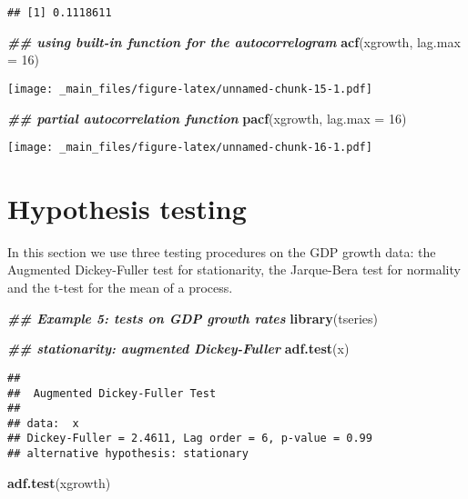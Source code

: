 \documentclass[
]{book}
\newenvironment{Shaded}{\begin{snugshade}}{\end{snugshade}}
\newcommand{\AttributeTok}[1]{\textcolor[rgb]{0.13,0.29,0.53}{#1}}
\newcommand{\DecValTok}[1]{\textcolor[rgb]{0.00,0.00,0.81}{#1}}
\newcommand{\DocumentationTok}[1]{\textcolor[rgb]{0.56,0.35,0.01}{\textbf{\textit{#1}}}}
\newcommand{\FunctionTok}[1]{\textcolor[rgb]{0.13,0.29,0.53}{\textbf{#1}}}
\newcommand{\NormalTok}[1]{#1}
\begin{document}
\begin{verbatim}
## [1] 0.1118611
\end{verbatim}

\begin{Shaded}
\begin{Highlighting}[]
\DocumentationTok{\#\# using built{-}in function for the autocorrelogram}
\FunctionTok{acf}\NormalTok{(xgrowth, }\AttributeTok{lag.max =} \DecValTok{16}\NormalTok{)}
\end{Highlighting}
\end{Shaded}

\texttt{[image: \_main\_files/figure-latex/unnamed-chunk-15-1.pdf]}

\begin{Shaded}
\begin{Highlighting}[]
\DocumentationTok{\#\# partial autocorrelation function}
\FunctionTok{pacf}\NormalTok{(xgrowth, }\AttributeTok{lag.max =} \DecValTok{16}\NormalTok{)}
\end{Highlighting}
\end{Shaded}

\texttt{[image: \_main\_files/figure-latex/unnamed-chunk-16-1.pdf]}

\hypertarget{hypothesis-testing}{%
\section{Hypothesis testing}\label{hypothesis-testing}}

In this section we use three testing procedures on the GDP growth data: the Augmented Dickey-Fuller test for stationarity, the Jarque-Bera test for normality and the t-test for the mean of a process.

\begin{Shaded}
\begin{Highlighting}[]
\DocumentationTok{\#\# Example 5: tests on GDP growth rates }
\FunctionTok{library}\NormalTok{(tseries)}

\DocumentationTok{\#\# stationarity: augmented Dickey{-}Fuller}
\FunctionTok{adf.test}\NormalTok{(x)}
\end{Highlighting}
\end{Shaded}

\begin{verbatim}
## 
##  Augmented Dickey-Fuller Test
## 
## data:  x
## Dickey-Fuller = 2.4611, Lag order = 6, p-value = 0.99
## alternative hypothesis: stationary
\end{verbatim}

\begin{Shaded}
\begin{Highlighting}[]
\FunctionTok{adf.test}\NormalTok{(xgrowth)}
\end{Highlighting}
\end{Shaded}
\end{document}
